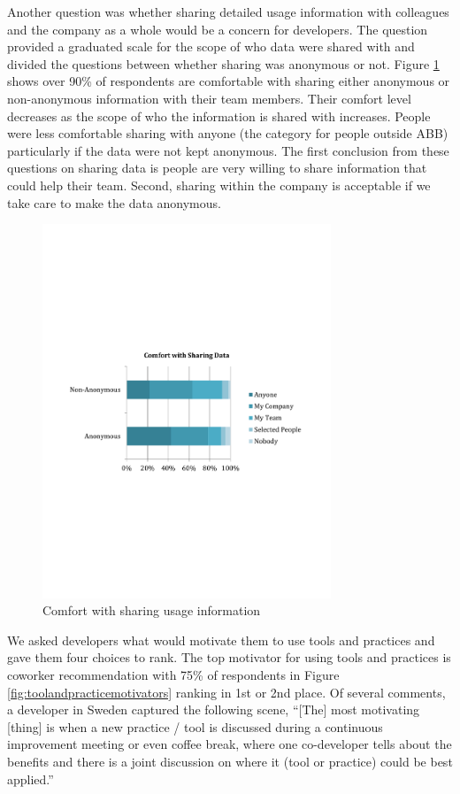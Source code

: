 \documentclass{sig-alternate}
\begin{document}
Another question was whether sharing detailed usage information with colleagues and the company as a whole would be a concern for developers.  The question provided a graduated scale for the scope of who data were shared with and divided the questions between whether sharing was anonymous or not. Figure \ref{fig:comfortwithsharing}  shows over 90\% of respondents are comfortable with sharing either anonymous or non-anonymous information with their team members. 
Their comfort level decreases as the scope of who the information is shared with increases.  People were less comfortable sharing with anyone (the category for people outside ABB) particularly if the data were not kept anonymous.  
The first conclusion from these questions on sharing data is people are very willing to share information that could help their team. Second, sharing within the company is acceptable if we take care to make the data anonymous.

\begin{figure}
	\includegraphics[width=3.4in]{ComfortWithSharing.pdf}
	\caption{Comfort with sharing usage information}
	\label{fig:comfortwithsharing}
\end{figure}

We asked developers what would motivate them to use tools and practices and gave them four choices to rank.  The top motivator for using tools and practices is coworker recommendation with 75\% of respondents in Figure \ref{fig:toolandpracticemotivators}   ranking in 1st or 2nd place.  Of several comments, a developer in Sweden captured the following scene, ``[The] most motivating [thing] is when a new practice / tool is discussed during a continuous improvement meeting or even coffee break, where one co-developer tells about the benefits and there is a joint discussion on where it (tool or practice) could be best applied.''  
\end{document}
